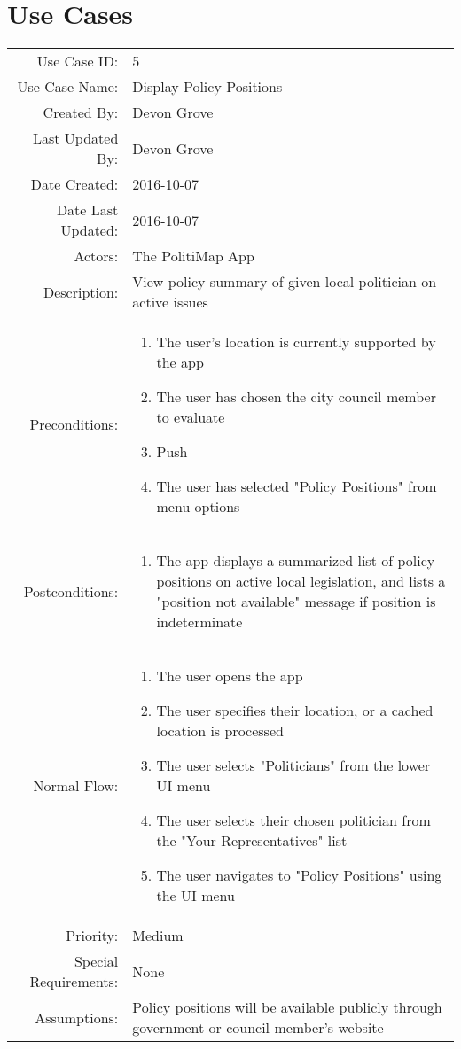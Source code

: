 \documentclass{article}
\begin{document}
\section{Use Cases}
\begin{tabu}{rX}
  \toprule
  Use Case ID: & 5\\
  Use Case Name: & Display Policy Positions\\
  Created By: & Devon Grove\\
  Last Updated By: & Devon Grove\\
  Date Created: & 2016-10-07\\
  Date Last Updated: & 2016-10-07\\
  Actors: & The PolitiMap App\\
  Description: & View policy summary of given local politician on active issues\\
  Preconditions: &
  \begin{enumerate}
  \item The user's location is currently supported by the app
  \item The user has chosen the city council member to evaluate
  \item Push
  \item The user has selected "Policy Positions" from menu options
  \end{enumerate} \\
  Postconditions: &
  \begin{enumerate}
  \item The app displays a summarized list of policy positions on active local legislation, and
  	lists a "position not available" message if position is indeterminate
  \end{enumerate} \\
  Normal Flow: &
  \begin{enumerate}
  \item The user opens the app
  \item The user specifies their location, or a cached location is processed
  \item The user selects "Politicians" from the lower UI menu
  \item The user selects their chosen politician from the "Your Representatives" list
  \item The user navigates to "Policy Positions" using the UI menu
  \end{enumerate} \\
  Priority: & Medium\\
  Special Requirements: & None\\
  Assumptions: & Policy positions will be available publicly through government or council member's website\\
  \bottomrule
\end{tabu}
\end{document}
